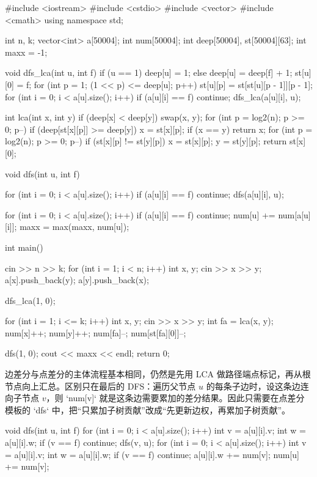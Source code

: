 \documentclass[UTF8,a4paper,11pt]{ctexart}
\newcommand{\topic}[1]{%
  \par\needspace{3\baselineskip}\vspace{0.45em}%
  \noindent{\bfseries\color{Primary}#1}\par\vspace{0.12em}%
}
\begin{document}
\begin{CodeBlock}
#include <iostream>
#include <cstdio>
#include <vector>
#include <cmath>
using namespace std;

int n, k;
vector<int> a[50004];
int num[50004];
int deep[50004], st[50004][63];
int maxx = -1;

void dfs_lca(int u, int f) {
    if (u == 1)
        deep[u] = 1;
    else
        deep[u] = deep[f] + 1;
    st[u][0] = f;
    for (int p = 1; (1 << p) <= deep[u]; p++)
        st[u][p] = st[st[u][p - 1]][p - 1];
    for (int i = 0; i < a[u].size(); i++) {
        if (a[u][i] == f)
            continue;
        dfs_lca(a[u][i], u);
    }
}

int lca(int x, int y) {
    if (deep[x] < deep[y])
        swap(x, y);
    for (int p = log2(n); p >= 0; p--) {
        if (deep[st[x][p]] >= deep[y])
            x = st[x][p];
    }
    if (x == y)
        return x;
    for (int p = log2(n); p >= 0; p--) {
        if (st[x][p] != st[y][p]) {
            x = st[x][p];
            y = st[y][p];
        }
    }
    return st[x][0];
}

void dfs(int u, int f) {
    for (int i = 0; i < a[u].size(); i++) {
        if (a[u][i] == f)
            continue;
        dfs(a[u][i], u);
    }

    for (int i = 0; i < a[u].size(); i++) {
        if (a[u][i] == f)
            continue;
        num[u] += num[a[u][i]];
    }
    maxx = max(maxx, num[u]);
}

int main() {
    cin >> n >> k;
    for (int i = 1; i < n; i++) {
        int x, y;
        cin >> x >> y;
        a[x].push_back(y);
        a[y].push_back(x);
    }

    dfs_lca(1, 0);

    for (int i = 1; i <= k; i++) {
        int x, y;
        cin >> x >> y;
        int fa = lca(x, y);
        num[x]++;
        num[y]++;
        num[fa]--;
        num[st[fa][0]]--;
    }

    dfs(1, 0);
    cout << maxx << endl;
    return 0;
}
\end{CodeBlock}

\topic{边差分模板}

边差分与点差分的主体流程基本相同，仍然是先用 LCA 做路径端点标记，再从根节点向上汇总。区别只在最后的 DFS：遍历父节点 $u$ 的每条子边时，设这条边连向子节点 $v$，则 `num[v]` 就是这条边需要累加的差分结果。因此只需要在点差分模板的 `dfs` 中，把“只累加子树贡献”改成“先更新边权，再累加子树贡献”。

\begin{CodeBlock}
void dfs(int u, int f) {
    for (int i = 0; i < a[u].size(); i++) {
        int v = a[u][i].v;
        int w = a[u][i].w;
        if (v == f)
            continue;
        dfs(v, u);
    }
    for (int i = 0; i < a[u].size(); i++) {
        int v = a[u][i].v;
        int w = a[u][i].w;
        if (v == f)
            continue;
        a[u][i].w += num[v];
        num[u] += num[v];
    }
}
\end{CodeBlock}
\end{document}
